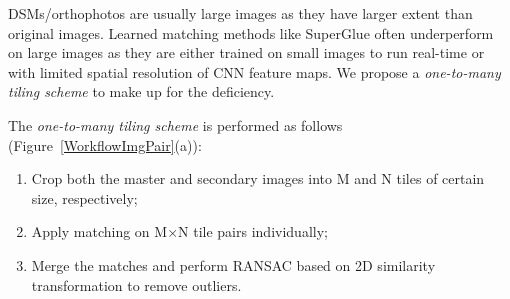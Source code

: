DSMs/orthophotos are usually large images as they have larger extent than original images.
Learned matching methods like SuperGlue often underperform on large images as they are either trained on small images to run real-time or with limited spatial resolution of CNN feature maps. We propose a \textit{one-to-many tiling scheme} to make up for the deficiency. 
\par
The \textit{one-to-many tiling scheme} is performed as follows (Figure~\ref{WorkflowImgPair}(a)):\\
\begin{enumerate}
    \item Crop both the master and secondary images into M and N tiles of certain size, respectively;
    \item Apply matching on M$\times$N tile pairs individually;
    \item Merge the matches and perform RANSAC based on 2D similarity transformation to remove outliers.
\end{enumerate}

